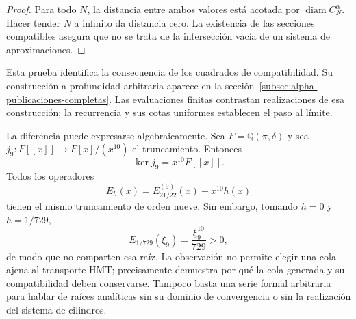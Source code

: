 \begin{proof}
Para todo \(N\), la distancia entre ambos valores está acotada
por \(\operatorname{diam}C_N^\alpha\). Hacer tender \(N\) a infinito
da distancia cero. La existencia de las secciones compatibles asegura
que no se trata de la intersección vacía de un sistema de aproximaciones.
\end{proof}

Esta prueba identifica la consecuencia de los cuadrados de compatibilidad.
Su construcción a profundidad arbitraria aparece en la
sección~\ref{subsec:alpha-publicaciones-completas}. Las evaluaciones
finitas contrastan realizaciones de esa construcción; la recurrencia
y sus cotas uniformes establecen el paso al límite.

La diferencia puede expresarse algebraicamente. Sea
\(F=\mathbb Q(\pi,\delta)\) y sea
\(j_9:F[[x]]\to F[x]/(x^{10})\) el truncamiento. Entonces
\[
 \ker j_9=x^{10}F[[x]].
\]
Todos los operadores
\[
 E_h(x)=E_{21/22}^{(9)}(x)+x^{10}h(x)
\]
tienen el mismo truncamiento de orden nueve. Sin embargo, tomando
\(h=0\) y \(h=1/729\),
\[
 E_{1/729}(\xi_9)=\frac{\xi_9^{10}}{729}>0,
\]
de modo que no comparten esa raíz. La observación no permite elegir una
cola ajena al transporte HMT; precisamente demuestra por qué la cola
generada y su compatibilidad deben conservarse. Tampoco basta una serie
formal arbitraria para hablar de raíces analíticas sin su dominio de
convergencia o sin la realización del sistema de cilindros.

